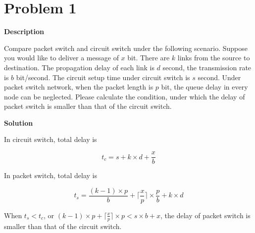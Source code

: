 \documentclass[12pt,letterpaper]{ctexart}
\begin{document}
\section*{Problem 1}

{\bf Description}

Compare packet switch and circuit switch under the following scenario.
Suppose you would like to deliver a message of $x$ bit.
There are $k$ links from the source to destination.
The propagation delay of each link is $d$ second, the transmission rate is $b$ bit/second.
The circuit setup time under circuit switch is $s$ second.
Under packet switch network, when the packet length is $p$ bit, the queue delay in every node can be neglected.
Please calculate the condition, under which the delay of packet switch is smaller than that of the circuit switch.

{\bf Solution}

  In circuit switch, total delay is

  $$
  t_{c} = s + k \times d + \frac{x}{b}
  $$

  In packet switch, total delay is

  $$
  t_{s} = \frac{(k - 1) \times p }{b} + \lceil \frac{x}{p}\rceil \times \frac{p}{b} + k \times  d
  $$

  When $t_s < t_c$, or $ (k - 1) \times p  + \lceil \frac{x}{p}\rceil \times p < s \times b + x $, the delay of packet switch is smaller than that of the circuit switch.





\end{document}
